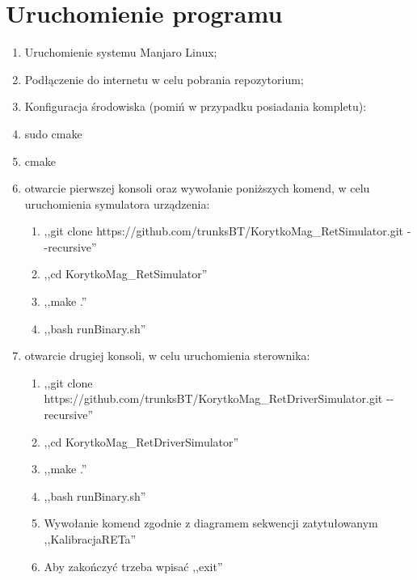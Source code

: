 \section{Uruchomienie programu}
    \begin{enumerate}
        \item Uruchomienie systemu Manjaro Linux;
        \item Podłączenie do internetu w celu pobrania repozytorium;
        \item Konfiguracja środowiska (pomiń w przypadku posiadania kompletu):
        
            \item sudo cmake
            \item cmake
        \item otwarcie pierwszej konsoli oraz wywołanie poniższych komend, w celu uruchomienia symulatora urządzenia:
		\begin{enumerate}
			\item ,,git clone https://github.com/trunksBT/KorytkoMag\_RetSimulator.git -{}-recursive''
			\item ,,cd KorytkoMag\_RetSimulator''
			\item ,,make .''
			\item ,,bash runBinary.sh''
		\end{enumerate}
		\item otwarcie drugiej konsoli, w celu uruchomienia sterownika:
		\begin{enumerate}
			\item ,,git clone https://github.com/trunksBT/KorytkoMag\_RetDriverSimulator.git -{}-recursive''
			\item ,,cd KorytkoMag\_RetDriverSimulator''
			\item ,,make .''
			\item ,,bash runBinary.sh''
			\item Wywołanie komend zgodnie z diagramem sekwencji zatytułowanym ,,KalibracjaRETa''
			\item Aby zakończyć trzeba wpisać ,,exit''
		\end{enumerate}
    \end{enumerate}
